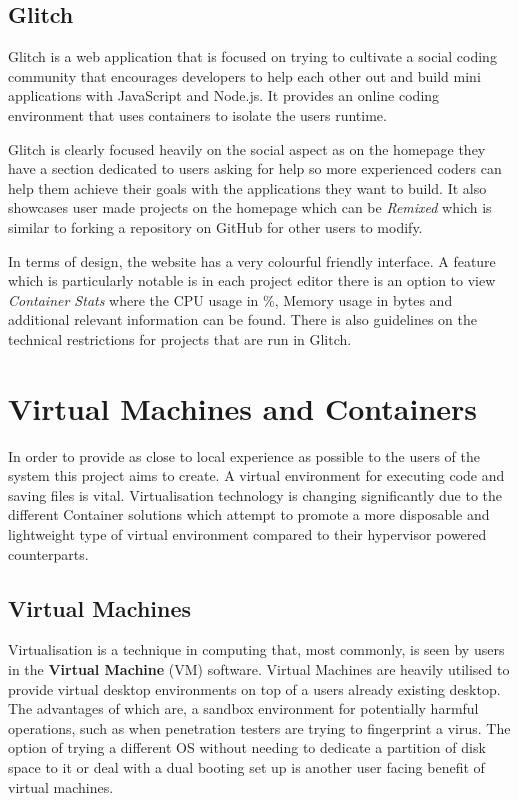 \subsection{Glitch}
Glitch is a web application that is focused on trying to cultivate a social coding community that encourages developers to help each other out and build mini applications with JavaScript and Node.js. It provides an online coding environment that uses containers to isolate the users runtime.

Glitch is clearly focused heavily on the social aspect as on the homepage they have a section dedicated to users asking for help so more experienced coders can help them achieve their goals with the applications they want to build. It also showcases user made projects on the homepage which can be \textit{Remixed} which is similar to forking a repository on GitHub for other users to modify.

In terms of design, the website has a very colourful friendly interface. A feature which is particularly notable is in each project editor there is an option to view \textit{Container Stats} where the CPU usage in \%, Memory usage in bytes and additional relevant information can be found. There is also guidelines on the technical restrictions for projects that are run in Glitch. 


\section{Virtual Machines and Containers} \label{lit-containers}

In order to provide as close to local experience as possible to the users of the system this project aims to create. A virtual environment for executing code and saving files is vital. Virtualisation technology is changing significantly due to the different Container solutions which attempt to promote a more disposable and lightweight type of virtual environment compared to their hypervisor powered counterparts.

\subsection{Virtual Machines}

Virtualisation is a technique in computing that, most commonly, is seen by users in the \textbf{Virtual Machine} (VM) software. Virtual Machines are heavily utilised to provide virtual desktop environments on top of a users already existing desktop. The advantages of which are, a sandbox environment for potentially harmful operations, such as when penetration testers are trying to fingerprint a virus. The option of trying a different OS without needing to dedicate a partition of disk space to it or deal with a dual booting set up is another user facing benefit of virtual machines.

